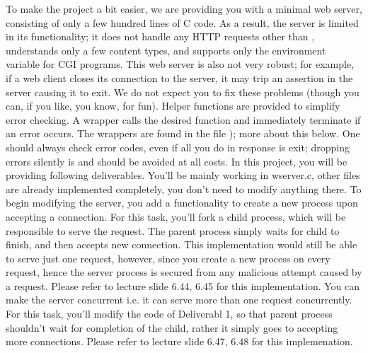 {}To make the project a bit easier, we are providing you with a minimal web server, consisting of only a few hundred lines of C code. As a result, the server is limited in its functionality; it does not handle any HTTP requests other than , understands only a few content types, and supports only the  environment variable for CGI programs. This web server is also not very robust; for example, if a web client closes its connection to the server, it may trip an assertion in the server causing it to exit. We do not expect you to fix these problems (though you can, if you like, you know, for fun).\markdownRendererInterblockSeparator
{}Helper functions are provided to simplify error checking. A wrapper calls the desired function and immediately terminate if an error occurs. The wrappers are found in the file ); more about this below. One should always check error codes, even if all you do in response is exit; dropping errors silently is  and should be avoided at all costs.\markdownRendererInterblockSeparator
{}\markdownRendererInterblockSeparator
{}In this project, you will be providing following deliverables. You'll be mainly working in wserver.c, other files are already implemented completely, you don't need to modify anything there. \markdownRendererInterblockSeparator
{}\markdownRendererInterblockSeparator
{}To begin modifying the server, you add a functionality to create a new process upon accepting a connection. For this task, you'll fork a child process, which will be responsible to serve the request. The parent process simply waits for child to finish, and then accepts new connection. This implementation would still be able to serve just one request, however, since you create a new process on every request, hence the server process is secured from any malicious attempt caused by a request. Please refer to lecture slide 6.44, 6.45 for this implementation.\markdownRendererInterblockSeparator
{}\markdownRendererInterblockSeparator
{}You can make the server concurrent i.e. it can serve more than one request concurrently. For this task, you'll modify the code of Deliverabl 1, so that parent process shouldn't wait for completion of the child, rather it simply goes to accepting more connections. Please refer to lecture slide 6.47, 6.48 for this implemenation. \markdownRendererInterblockSeparator
